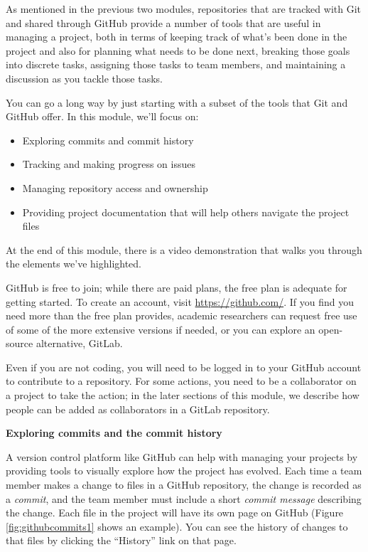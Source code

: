\documentclass[]{tufte-book}
\providecommand{\tightlist}{%
  \setlength{\itemsep}{0pt}\setlength{\parskip}{0pt}}
\begin{document}
As mentioned in the previous two modules, repositories that are tracked with
Git and shared through GitHub provide a number of tools that are useful in
managing a project, both in terms of keeping track of what's been done in the
project and also for planning what needs to be done next, breaking those goals
into discrete tasks, assigning those tasks to team members, and maintaining a
discussion as you tackle those tasks.

You can go a long way by just starting with a subset of the tools that Git and
GitHub offer. In this module, we'll focus on:

\begin{itemize}
\tightlist
\item
  Exploring commits and commit history
\item
  Tracking and making progress on issues
\item
  Managing repository access and ownership
\item
  Providing project documentation that will help others navigate the project
  files
\end{itemize}

At the end of this module, there is a video demonstration that walks you through
the elements we've highlighted.

GitHub is free to join; while there are paid plans, the free plan is adequate
for getting started. To create an account, visit \url{https://github.com/}. If you
find you need more than the free plan provides, academic researchers can request
free use of some of the more extensive versions if needed, or you can explore an
open-source alternative, GitLab.

Even if you are not coding, you will need to be logged in to your GitHub account
to contribute to a repository. For some actions, you need to be a collaborator
on a project to take the action; in the later sections of this module, we
describe how people can be added as collaborators in a GitLab repository.

\textbf{Exploring commits and the commit history}

A version control platform like GitHub can help with managing your projects
by providing tools to visually explore how the project has evolved.
Each time a team member makes a change to files in a GitHub repository, the
change is recorded as a \emph{commit}, and the team member must include a short
\emph{commit message} describing the change. Each file in the project will have its
own page on GitHub (Figure \ref{fig:githubcommits1} shows an example). You can
see the history of changes to that files by clicking the ``History'' link on that
page.
\end{document}
